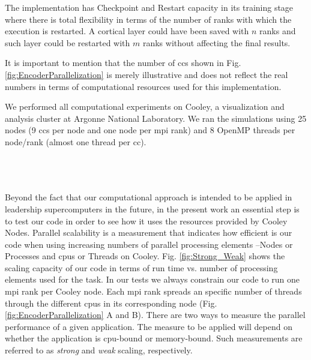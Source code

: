 \documentclass[10pt,letterpaper]{article}
\begin{document}
\pagebreak

The implementation has Checkpoint and Restart capacity in its training stage where there is total flexibility
in terms of the number of ranks with which the execution is restarted. A cortical layer could have been saved
with $n$ ranks and such layer could be restarted with $m$ ranks without affecting the final results.


It is important to mention that the number of \glspl{cc} shown in
Fig. \ref{fig:EncoderParallelization} is merely illustrative and
does not reflect the real numbers in terms of computational resources used for this implementation.


We performed all computational experiments on Cooley, a visualization and analysis cluster at Argonne National Laboratory. We ran the simulations using 25 nodes (9 \glspl{cc} per node and one node per \gls{mpi} rank) and 8 OpenMP threads per node/rank (almost one thread per \gls{cc}).



~\\
~\\
~\\

Beyond the fact that our computational approach is intended to be applied in leadership supercomputers in the future, in the present work an essential step is to test our code in order to see how it uses the resources provided by Cooley Nodes.
Parallel scalability is a measurement that indicates how efficient is our code when using increasing numbers of parallel processing elements --Nodes or Processes and \glspl{cpu} or Threads on Cooley.
Fig. \ref{fig:Strong_Weak} shows the scaling capacity of our code in terms of run time vs. number of processing elements used for the task.
In our tests we always constrain our code to run one \gls{mpi} rank per Cooley node. Each \gls{mpi} rank spreads an specific number of threads through the different \glspl{cpu} in its corresponding node (Fig. \ref{fig:EncoderParallelization} A and B).
There are two ways to measure the parallel performance of a given application. The measure to be applied will depend on whether the application is \gls{cpu}-bound or memory-bound. Such measurements are referred to as \emph{strong} and \emph{weak} scaling, respectively.
\end{document}
